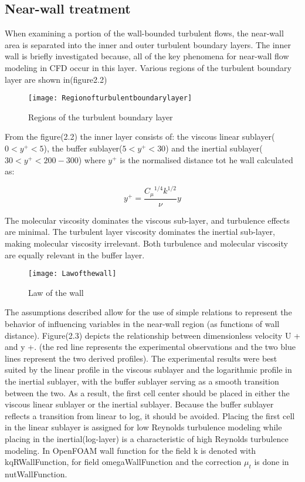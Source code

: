\subsection{Near-wall treatment}
 When examining a portion of the wall-bounded turbulent
flows, the near-wall area is separated into the inner and outer turbulent
boundary layers. The inner wall is briefly investigated because, all of the key
phenomena for near-wall flow modeling in CFD occur in this
layer. Various regions of the turbulent boundary layer are shown
in(figure2.2)

\begin{figure}[H]
 \centering
 \texttt{[image: Regionofturbulentboundarylayer]}
 \caption{Regions of the turbulent boundary layer \cite{Menter}}
 \label{fig:fig14}
\end{figure}

From the figure(2.2) the inner layer consists of: the viscous linear
sublayer($0<{y^+}<5$), the buffer sublayer($5<{y^+}<30$) and the
inertial sublayer($30<{y^+}<200-300$) where ${y^+}$ is the normalised
distance tot he wall calculated as:

\begin{equation}
{y^+}={\frac{{{C_{\mu}}^{1/4}}{k^{1/2}}}{\nu}}y
\end{equation}

The molecular viscosity dominates the viscous sub-layer, and
turbulence effects are minimal. The turbulent layer viscosity
dominates the inertial sub-layer, making molecular viscosity
irrelevant.  Both turbulence and molecular viscosity are equally
relevant in the buffer layer. \\

\begin{figure}[H]
 \centering
 \texttt{[image: Lawofthewall]}
 \caption{Law of the wall \cite{Menter}}
 \label{fig:fig15}
\end{figure}

The assumptions described allow for the use of simple relations to
represent the behavior of influencing variables in the near-wall
region (as functions of wall distance).  Figure(2.3) depicts the
relationship between dimensionless velocity U + and y +. (the red line
represents the experimental observations and the two blue lines
represent the two derived profiles).  The experimental results were
best suited by the linear profile in the viscous sublayer and the
logarithmic profile in the inertial sublayer, with the buffer sublayer
serving as a smooth transition between the two.  As a result, the
first cell center should be placed in either the viscous linear
sublayer or the inertial sublayer. Because the buffer sublayer
reflects a transition from linear to log, it should be avoided.
Placing the first cell in the linear sublayer is assigned for low
Reynolds turbulence modeling while placing in the inertial(log-layer)
is a characteristic of high Reynolds turbulence modeling. In OpenFOAM
wall function for the field k is denoted with kqRWallFunction, for
field omegaWallFunction and the correction ${\mu}_t$ is done
in nutWallFunction.

